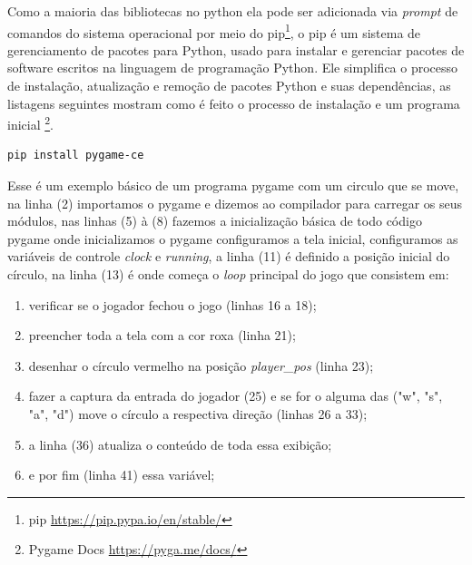 Como a maioria das bibliotecas no python ela pode ser adicionada via \textit{prompt} de comandos do sistema operacional  por meio do pip\footnote{pip \url{https://pip.pypa.io/en/stable/}}, o pip é um sistema de gerenciamento de pacotes para Python, usado para instalar e gerenciar pacotes de software escritos na linguagem de programação Python. Ele simplifica o processo de instalação, atualização e remoção de pacotes Python e suas dependências, as listagens seguintes mostram como é feito o processo de instalação e um programa inicial \footnote{Pygame Docs \url{https://pyga.me/docs/}}. 

\newpage
\begin{lstlisting}[language=bash,breaklines, caption= Instalação Pygame]
pip install pygame-ce
\end{lstlisting}

Esse é um exemplo básico de um programa pygame com um circulo que se move, na linha (2) importamos o pygame e dizemos ao compilador para carregar os seus módulos, nas linhas (5) à (8) fazemos a inicialização básica de todo código pygame onde inicializamos o pygame configuramos a tela inicial, configuramos as variáveis de controle \textit{clock} e \textit{running}, a linha (11) é definido a posição inicial do círculo, na linha (13) é onde começa o \textit{loop} principal do jogo que consistem em:
\begin{enumerate}
    \item verificar se o jogador fechou o jogo (linhas 16 a 18);
    \item preencher toda a tela com a cor roxa (linha 21);
    \item desenhar o círculo vermelho na posição \textit{player\_pos} (linha 23);
    \item fazer a captura da entrada do jogador (25) e se for o alguma das ("w", "s", "a", "d") move o círculo a respectiva direção (linhas 26 a 33);
    \item a linha (36) atualiza o conteúdo de toda essa exibição;
    \item e por fim (linha 41) essa variável;
\end{enumerate}

